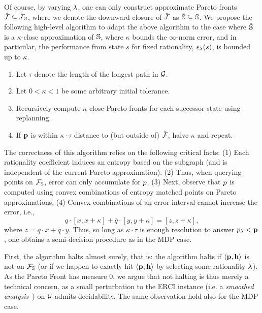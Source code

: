 Of course, by varying $\lambda$, one can only construct approximate
Pareto fronts $\hat{\mathcal{F}_{}} \subseteq \mathcal{F}_{\mathbb{S}}$, where we denote the downward closure of $\hat{\mathcal{F}_{}}$ as $\hat{\mathbb{S}} \subseteq \mathbb{S}$.
We propose the following high-level algorithm to
adapt the above algorithm to the case where
$\hat{\mathbb{S}}$ is a $\kappa$-close approximation of $\mathbb{S}$,
where $\kappa$ bounds the $\infty$-norm error, and in particular, the
performance from state $s$ for fixed rationality,
$\epsilon_\lambda(s)$, is bounded up to $\kappa$.
\begin{mdframed}
\begin{enumerate}
\item Let $\tau$ denote the length of the longest path in $\mathcal{G}$.
\item Let $0 < \kappa < 1$ be some arbitrary initial tolerance.
\item Recursively compute $\kappa$-close Pareto fronts for each successor state using replanning.
\item If $\mathbf{p}$ is within $\kappa\cdot \tau$ distance to (but outside of) $\hat{\mathcal{F}_{}}$,
  halve $\kappa$ and repeat.
\end{enumerate}  
\end{mdframed}
The correctness of this algorithm relies on the following critical
facts: (1) Each rationality coefficient induces an entropy based on
the subgraph (and is independent of the current Pareto
approximation). (2) Thus, when querying points on
$\mathcal{F}_{\mathbb{S}}$, error can only accumulate for $p$. (3) Next,
observe that $p$ is computed using convex combinations of entropy
matched points on Pareto approximations. (4) Convex combinations of an error interval cannot
increase the error, i.e.,
\begin{equation}
  q\cdot[x, x + \kappa] + \bar{q}\cdot[y, y + \kappa] = [z, z + \kappa],
\end{equation}
where $z = q\cdot x + \bar{q}\cdot y$.
Thus, so long as $\kappa\cdot\tau$ is enough resolution to answer $p_\lambda <
\mathbf{p}$, one obtains a semi-decision procedure as in the MDP
case.

First, the algorithm halts almost surely, that is: 
the algorithm halts if $\langle \mathbf{p}, \mathbf{h} \rangle$ is
not on $\mathcal{F}_{\mathbb{S}}$ (or if we happen to exactly hit $\langle \mathbf{p}, \mathbf{h}\rangle$ by selecting some rationality $\lambda$).
As the Pareto Front has
measure 0, we argue that not halting is thus merely a technical concern, as a
small perturbation to the ERCI instance (i.e. a \emph{smoothed
analysis}~\cite{SmoothedAnalysis}) on $\mathcal{G}$ admits decidability. 
The same observation hold also for the MDP case.

